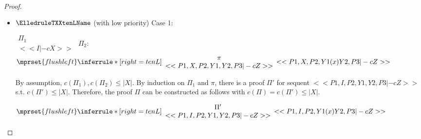 \begin{proof}
\begin{enumerate}
\begin{itemize}
  \item $\ElledruleTXXtenLName$ (with low priority) Case 1:
      \begin{center}
        \scriptsize
        \begin{math}
          \begin{array}{c}
            \Pi_1 \\
            {<<I |-c X>>}
          \end{array}
        \end{math}
        \qquad\qquad
        $\Pi_2$:
        \begin{math}
          $$\mprset{flushleft}
          \inferrule* [right={\tiny tenL}] {
            {
              \begin{array}{c}
                \pi \\
                {<<P1, X, P2, Y1, Y2, P3 |-c Z>>}
              \end{array}
            }
          }{<<P1, X, P2, Y1 (x) Y2, P3 |-c Z>>}
        \end{math}
      \end{center}
      By assumption, $c(\Pi_1),c(\Pi_2)\leq |X|$. By induction on $\Pi_1$ and $\pi$, there is
      a proof $\Pi'$ for sequent $<<P1, I, P2, Y1, Y2, P3 |-c Z>>$ s.t. $c(\Pi') \leq |X|$.
      Therefore, the proof $\Pi$ can be constructed as follows with
      $c(\Pi) = c(\Pi') \leq |X|$.
      \begin{center}
        \scriptsize
        \begin{math}
          $$\mprset{flushleft}
          \inferrule* [right={\tiny tenL}] {
            {
              \begin{array}{c}
                \Pi' \\
                {<<P1, I, P2, Y1, Y2, P3 |-c Z>>}
              \end{array}
            }
          }{<<P1, I, P2, Y1 (x) Y2, P3 |-c Z>>}
        \end{math}
      \end{center}


\end{itemize}
\end{enumerate}
\end{proof}
